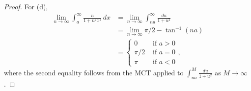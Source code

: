 \documentclass{article}
\begin{document}
\begin{proof}
For (d),
\begin{align*}
\lim_{n \to \infty} \int_a^\infty \frac n {1 + n^2 x^2} \, dx  & = \lim_{n \to \infty} \int_{na}^\infty \frac {du} {1 + u^2} 
\\ & = \lim_{n \to \infty} \pi/2 - \tan^{-1}(na)
\\ & = \left\{ 
\begin{array}{ll}
   0 & \text{ if } a > 0
\\ \pi/2 & \text{ if } a = 0
\\ \pi  & \text{ if } a < 0
\end{array} \right.,
\end{align*}
where the second equality follows from the MCT applied to $\int_{na}^M \frac {du} {1+u^2}$ as $M \to \infty$.



\end{proof}
\end{document}

